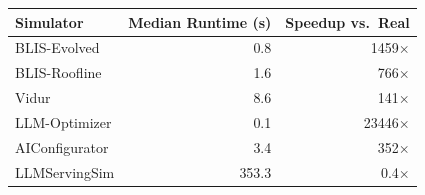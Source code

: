 \begin{tabular}{lrr}
\toprule
Simulator & Median Runtime (s) & Speedup vs.\ Real \\
\midrule
BLIS-Evolved & 0.8 & 1459$\times$ \\
BLIS-Roofline & 1.6 & 766$\times$ \\
Vidur & 8.6 & 141$\times$ \\
LLM-Optimizer & 0.1 & 23446$\times$ \\
AIConfigurator & 3.4 & 352$\times$ \\
LLMServingSim & 353.3 & 0.4$\times$ \\
\bottomrule
\end{tabular}